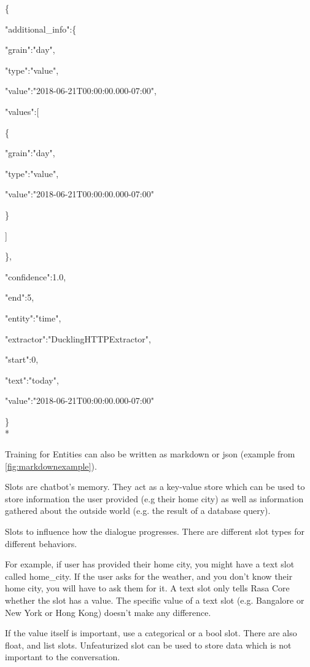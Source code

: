 \{
  
  \quad"additional\_info":\{

    \qquad"grain":"day",

    \qquad"type":"value",

    \qquad"value":"2018-06-21T00:00:00.000-07:00",

    \qquad"values":[

      \quad\qquad\{

        \qquad\qquad"grain":"day",

        \qquad\qquad"type":"value",

        \qquad\qquad"value":"2018-06-21T00:00:00.000-07:00"

      \quad\qquad\}

    \qquad]

  \quad\},

  \quad"confidence":1.0,

  \quad"end":5,

  \quad"entity":"time",

  \quad"extractor":"DucklingHTTPExtractor",

  \quad"start":0,

  \quad"text":"today",

  \quad"value":"2018-06-21T00:00:00.000-07:00"

\}
\\*

Training for Entities can also be written as markdown or json (example from \ref{fig:markdownexample}).


Slots are chatbot’s memory. They act as a key-value store which can be used to store information the user provided (e.g their home city) as well as information gathered about the outside world (e.g. the result of a database query).

Slots to influence how the dialogue progresses. There are different slot types for different behaviors.

For example, if user has provided their home city, you might have a text slot called home\_city. If the user asks for the weather, and you don’t know their home city, you will have to ask them for it. A text slot only tells Rasa Core whether the slot has a value. The specific value of a text slot (e.g. Bangalore or New York or Hong Kong) doesn’t make any difference.

If the value itself is important, use a categorical or a bool slot. There are also float, and list slots. Unfeaturized slot can be used to store data which is not important to the conversation.

